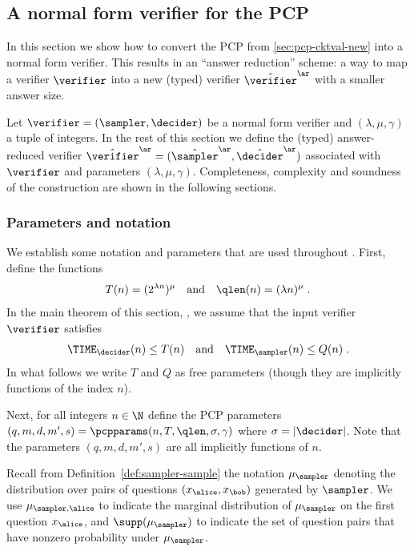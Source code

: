 \subsection{A normal form verifier for the PCP}
\label{sec:ld-compiler}

\def\tvans{\hat{\verifier}^\ar}
\def\tsans{\hat{\sampler}^\ar}
\def\tdans{\hat{\decider}^\ar}
\def\vans{\verifier^\ar}
\def\sans{\sampler^\ar}
\def\dans{\decider^\ar}

In this section we show how to convert the PCP from \cref{sec:pcp-cktval-new}
into a normal form verifier.
This results in an ``answer reduction'' scheme: a way to map a verifier
$\verifier$ into a new (typed) verifier $\tvans$ with a smaller answer size.
	
Let $\verifier = (\sampler, \decider)$ be a normal form verifier and
$(\lambda,\mu,\gamma)$ a tuple of integers.
In the rest of this section we define the (typed) answer-reduced verifier $\tvans =
(\tsans, \tdans)$ associated with $\verifier$ and parameters $(\lambda, \mu, \gamma)$.
Completeness, complexity and soundness of the construction are shown in the
following sections.

\subsubsection{Parameters and notation}\label{sec:ar-params}
We establish some notation and parameters that are used throughout . 
First, define the functions
\begin{equation}
  \label{eq:ar-params-1}
  T(n)=(2^{\lambda n})^\mu \quad\text{and} \quad \qlen(n) = (\lambda n)^{\mu}\;.
\end{equation} 
In the main theorem of this section, , we assume that the input
verifier $\verifier$ satisfies
\begin{equation}
  \label{eq:ar-time-assumption}
  \TIME_\decider(n) \leq T(n)\quad
  \text{and}\quad \TIME_\sampler(n) \leq Q(n) \;.
\end{equation}
In what follows we write $T$ and $Q$ as free parameters (though they are
implicitly functions of the index $n$).

Next, for all integers $n \in \N$ define the PCP parameters $(q,m,d,m',s) =
\pcpparams(n, T, \qlen, \sigma, \gamma)$ where $\sigma = |\decider|$.
Note that the parameters $(q,m,d,m',s)$ are all implicitly functions of $n$.





Recall from Definition~\ref{def:sampler-sample} the notation $\mu_{\sampler}$
denoting the distribution over pairs of questions $(x_\alice,x_\bob)$ generated by
$\sampler$.
We use $\mu_{\sampler, \alice}$ to indicate the marginal distribution of
$\mu_\sampler$ on the first question $x_\alice$, and $\supp(\mu_{\sampler})$ to
indicate the set of question pairs that have nonzero probability under
$\mu_\sampler$.

